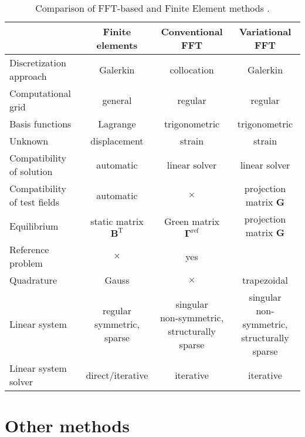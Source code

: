 \begin{table}
  \caption{Comparison of FFT-based and Finite Element methods \citep{zeman_finite_2017}.}
\label{tab:comparison_fem_fft}
  \begin{tabular}{lccc}
  \hline & \vphantom{\Big |}Finite elements & Conventional FFT & Variational FFT \\
  \hline\hline \makecell[l]{Discretization\\approach} & \vphantom{\Big |}Galerkin & collocation & Galerkin \\
  Computational grid & general & regular & regular \\
  Basis functions & \vphantom{\Big |}Lagrange & trigonometric & trigonometric \\
  Unknown & \vphantom{\Big |}displacement & strain & strain \\
  \makecell[l]{Compatibility\\of solution} & automatic & linear solver & linear solver \\
  \makecell[l]{Compatibility\\of test fields} & automatic & \(\times\) & projection matrix \(\bm{G}\) \\
  Equilibrium & \vphantom{\Big |}static matrix \(\bm{B}^{\mathrm{T}}\) & Green matrix \(\bm{\Gamma}^{\text {ref}}\) & projection matrix \(\bm{G}\) \\
  Reference problem & \(\times\) & yes & \\
  Quadrature & Gauss & \(\times\) & trapezoidal \\
  Linear system & \makecell[c]{regular\\symmetric,\\sparse} & \makecell[c]{singular\\non-symmetric,\\structurally\\sparse} & \makecell[c]{singular\\non-symmetric,\\structurally\\sparse} \\
  Linear system solver & direct/iterative & iterative & iterative \\
  \hline\hline
  \end{tabular}
\end{table}


\section{Other methods}

